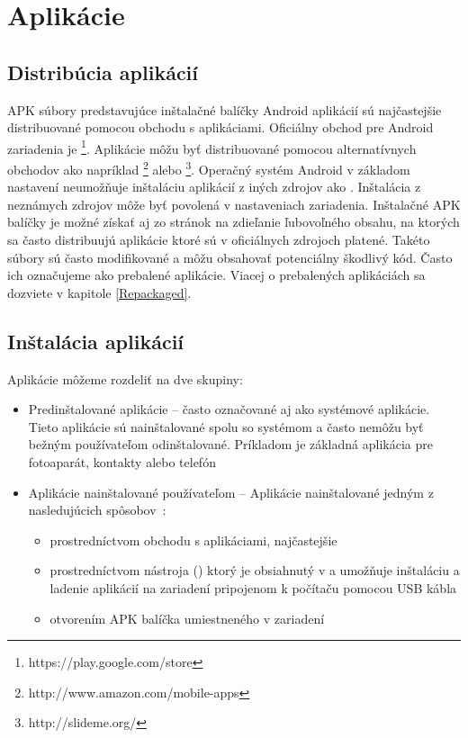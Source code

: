 
\section{Aplikácie}
\subsection{Distribúcia aplikácií}

APK súbory predstavujúce inštalačné balíčky Android aplikácií sú najčastejšie distribuované pomocou obchodu s aplikáciami. Oficiálny obchod pre Android zariadenia je \footnote{https://play.google.com/store}. Aplikácie môžu byť distribuované pomocou alternatívnych obchodov ako napríklad \footnote{http://www.amazon.com/mobile-apps} alebo \footnote{http://slideme.org/}. Operačný systém Android v základom nastavení neumožňuje inštaláciu aplikácií z iných zdrojov ako . Inštalácia z neznámych zdrojov môže byť povolená v nastaveniach zariadenia. Inštalačné APK balíčky je možné získať aj zo stránok na zdieľanie ľubovoľného obsahu, na ktorých sa často distribuujú aplikácie ktoré sú v oficiálnych zdrojoch platené. Takéto súbory sú často modifikované a môžu obsahovať potenciálny škodlivý kód. Často ich označujeme ako prebalené aplikácie. Viacej o prebalených aplikáciách sa dozviete v kapitole \ref{Repackaged}.

\subsection{Inštalácia aplikácií}
Aplikácie môžeme rozdeliť na dve skupiny:\\
\begin{itemize}
\item Predinštalované aplikácie – často označované aj ako systémové aplikácie. Tieto aplikácie sú nainštalované spolu so systémom a často nemôžu byť bežným používateľom odinštalované. Príkladom je základná aplikácia pre fotoaparát, kontakty alebo telefón
\item Aplikácie nainštalované používateľom – Aplikácie nainštalované jedným z nasledujúcich spôsobov~\cite{Elenkov2015}:
\begin{itemize}
\item prostredníctvom obchodu s aplikáciami, najčastejšie 
\item prostredníctvom nástroja  () ktorý je obsiahnutý v  a umožňuje inštaláciu a ladenie aplikácií na zariadení pripojenom k počítaču pomocou USB kábla
\item otvorením APK balíčka umiestneného v zariadení
\end{itemize}
\end{itemize}

